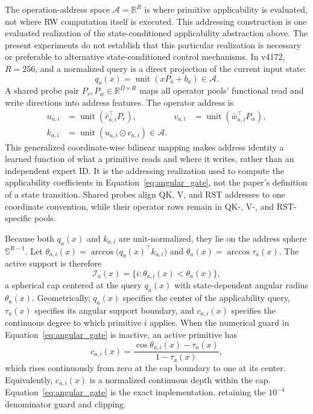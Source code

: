 \documentclass{article}
\newcommand{\R}{\mathbb{R}}
\newcommand{\od}{\mathbin{\odot}}
\begin{document}
The operation-address space \(\mathcal{A}=\R^R\) is where primitive
applicability is evaluated, not where RW computation itself is executed. This
addressing construction is one evaluated realization of the state-conditioned
applicability abstraction above. The present experiments do not establish that
this particular realization is necessary or preferable to alternative
state-conditioned control mechanisms. In v4172, \(R=256\), and a normalized
query is a direct projection of the current input state:
\begin{equation}
q_a(x)=\operatorname{unit}(xP_a+b_a)\in\mathcal{A}.
\label{eq:query}
\end{equation}
A shared probe pair \(P_r,P_w\in\R^{D\times R}\) maps all operator pools'
functional read and write directions into address features. The
operator address is
\begin{align}
u_{a,i}&=\operatorname{unit}(\bar r_{a,i}^{\top}P_r),&
v_{a,i}&=\operatorname{unit}(\bar w_{a,i}^{\top}P_w),\nonumber\\
k_{a,i}&=\operatorname{unit}(u_{a,i}\od v_{a,i})\in\mathcal{A}.
\label{eq:rw_address}
\end{align}
This generalized coordinate-wise bilinear mapping makes address identity a
learned function of what a primitive reads and where it writes, rather than an
independent expert ID. It is the addressing realization used to compute the
applicability coefficients in Equation~\ref{eq:angular_gate}, not the paper's
definition of a state transition. Shared probes align QK, V, and RST addresses
to one coordinate convention, while their operator rows remain in QK-, V-, and
RST-specific pools.

Because both \(q_a(x)\) and \(k_{a,i}\) are unit-normalized, they lie on the
address sphere \(\mathbb{S}^{R-1}\). Let
\(\theta_{a,i}(x)=\arccos\!\big(q_a(x)^\top k_{a,i}\big)\) and
\(\theta_a(x)=\arccos\tau_a(x)\). The active support is therefore
\[
\mathcal{I}_a(x)
=\{i:\theta_{a,i}(x)<\theta_a(x)\},
\]
a spherical cap centered at the query \(q_a(x)\) with state-dependent angular
radius \(\theta_a(x)\). Geometrically, \(q_a(x)\) specifies the center of the
applicability query, \(\tau_a(x)\) specifies its angular support boundary, and
\(c_{a,i}(x)\) specifies the continuous degree to which primitive \(i\)
applies. When the
numerical guard in Equation~\ref{eq:angular_gate} is inactive, an active
primitive has
\[
c_{a,i}(x)=
\frac{\cos\theta_{a,i}(x)-\tau_a(x)}{1-\tau_a(x)},
\]
which rises continuously from zero at the cap boundary to one at its center.
Equivalently, \(c_{a,i}(x)\) is a normalized continuous depth within the cap.
Equation~\ref{eq:angular_gate} is the exact implementation, retaining the
\(10^{-4}\) denominator guard and clipping.
\end{document}
